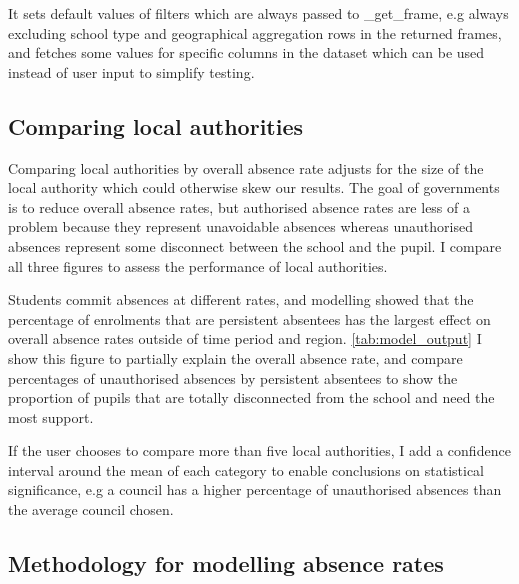 \documentclass{article}
\begin{document}
    It sets default values of filters which are always passed to \_get\_frame, e.g always excluding school type and geographical aggregation rows in the returned frames, and fetches some values for specific columns in the dataset which can be used instead of user input to simplify testing.

    \subsection*{Comparing local authorities}
    Comparing local authorities by overall absence rate adjusts for the size of the local authority which could otherwise skew our results. The goal of governments is to reduce overall absence rates, but authorised absence rates are less of a problem because they represent unavoidable absences whereas unauthorised absences represent some disconnect between the school and the pupil. I compare all three figures to assess the performance of local authorities.

    Students commit absences at different rates, and modelling showed that the percentage of enrolments that are persistent absentees has the largest effect on overall absence rates outside of time period and region. \ref{tab:model_output} I show this figure to partially explain the overall absence rate, and compare percentages of unauthorised absences by persistent absentees to show the proportion of pupils that are totally disconnected from the school and need the most support.

    If the user chooses to compare more than five local authorities, I add a confidence interval around the mean of each category to enable conclusions on statistical significance, e.g a council has a higher percentage of unauthorised absences than the average council chosen.

    \subsection*{Methodology for modelling absence rates}
    
\end{document}
